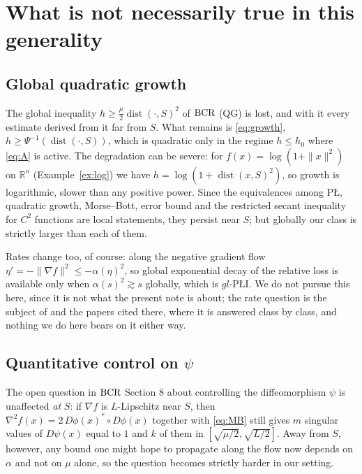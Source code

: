 \documentclass[11pt]{article}
\theoremstyle{plain}
\theoremstyle{definition}
\theoremstyle{remark}
\newcommand{\R}{\mathbb{R}}
\DeclareMathOperator{\dist}{dist}
\newcommand{\bcr}{\textup{BCR}}
\begin{document}
\section{What is not necessarily true in this generality}
\label{sec:fails}

\subsection{Global quadratic growth}

The global inequality $h \ge \tfrac{\mu}{2}\dist(\cdot,S)^2$ of $\bcr$ (QG) is
lost, and with it every estimate derived from it far from $S$. What remains is
\eqref{eq:growth}, $h \ge \Psi^{-1}(\dist(\cdot,S))$, which is quadratic only in
the regime $h\le h_0$ where \eqref{eq:A} is active. The degradation can be
severe: for $f(x)=\log(1+\|x\|^2)$ on $\R^n$ (Example~\ref{ex:log}) we have
$h = \log(1+\dist(x,S)^2)$, so growth is logarithmic, slower than any positive
power. Since the equivalences among P\L{}, quadratic growth, Morse--Bott, error
bound and the restricted secant inequality for $C^2$ functions \cite{RB2024a}
are local statements, they persist near $S$; but globally our class is strictly
larger than each of them.

Rates change too, of course: along the negative gradient flow
$\eta' = -\|\nabla f\|^2 \le -\alpha(\eta)^2$, so global exponential decay of the
relative loss is available only when $\alpha(s)^2\gtrsim s$ globally, which is
$gl$-P\L{}I. We do not pursue this here, since it is not what the present note is
about; the rate question is the subject of \cite{Sontag2025L4DC} and the papers
cited there, where it is answered class by class, and nothing we do here bears on
it either way.

\subsection{Quantitative control on $\psi$}

The open question in $\bcr$ Section 8 about controlling the diffeomorphism
$\psi$ is unaffected \emph{at} $S$: if $\nabla f$ is $L$-Lipschitz near $S$,
then $\nabla^2 f(x) = 2\,D\phi(x)^*\circ D\phi(x)$ together with \eqref{eq:MB}
still gives $m$ singular values of $D\psi(x)$ equal to $1$ and $k$ of them in
$[\sqrt{\mu/2},\sqrt{L/2}]$. Away from $S$, however, any bound one might hope to
propagate along the flow now depends on $\alpha$ and not on $\mu$ alone, so the
question becomes strictly harder in our setting.
\end{document}

